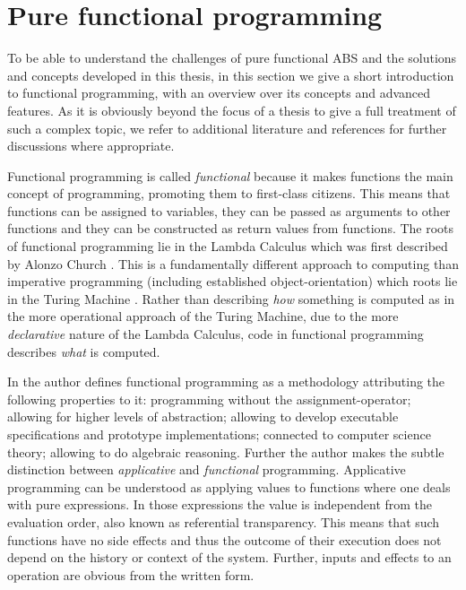\section{Pure functional programming}
\label{sec:background_fp}
To be able to understand the challenges of pure functional ABS and the solutions and concepts developed in this thesis, in this section we give a short introduction to functional programming, with an overview over its concepts and advanced features. As it is obviously beyond the focus of a thesis to give a full treatment of such a complex topic, we refer to additional literature and references for further discussions where appropriate.

Functional programming is called \textit{functional} because it makes functions the main concept of programming, promoting them to first-class citizens. This means that functions can be assigned to variables, they can be passed as arguments to other functions and they can be constructed as return values from functions. The roots of functional programming lie in the Lambda Calculus which was first described by Alonzo Church \cite{church_unsolvable_1936}. This is a fundamentally different approach to computing than imperative programming (including established object-orientation)  which roots lie in the Turing Machine \cite{turing_computable_1937}. Rather than describing \textit{how} something is computed as in the more operational approach of the Turing Machine, due to the more \textit{declarative} nature of the Lambda Calculus, code in functional programming describes \textit{what} is computed.

In \cite{maclennan_functional_1990} the author defines functional programming as a methodology attributing the following properties to it: programming without the assignment-operator; allowing for higher levels of abstraction; allowing to develop executable specifications and prototype implementations; connected to computer science theory; allowing to do algebraic reasoning. Further the author makes the subtle distinction between \textit{applicative} and \textit{functional} programming. Applicative programming can be understood as applying values to functions where one deals with pure expressions. In those expressions the value is independent from the evaluation order, also known as referential transparency. This means that such functions have no side effects and thus the outcome of their execution does not depend on the history or context of the system. Further, inputs and effects to an operation are obvious from the written form.

